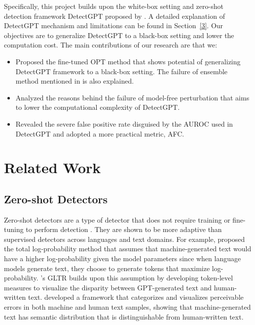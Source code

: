 \documentclass[11pt]{article}
\begin{document}
Specifically, this project builds upon the white-box setting and zero-shot detection framework DetectGPT proposed by \citet{detectgpt}. A detailed explanation of DetectGPT mechanism and limitations can be found in Section~\ref{3}. Our objectives are to generalize DetectGPT to a black-box setting and lower the computation cost. The main contributions of our research are that we:

\begin{itemize}[noitemsep, topsep=-8pt]
    \item Proposed the fine-tuned OPT method that shows potential of generalizing DetectGPT framework to a black-box setting. The failure of ensemble method mentioned in \citet{detectgpt} is also explained. 
    \item Analyzed the reasons behind the failure of model-free perturbation that aims to lower the computational complexity of DetectGPT.
    \item Revealed the severe false positive rate disguised by the AUROC used in DetectGPT and adopted a more practical metric, AFC.
\end{itemize}

\section{Related Work}
\subsection{Zero-shot Detectors}
Zero-shot detectors are a type of detector that does not require training or fine-tuning to perform detection \cite{jawahar20}. They are shown to be more adaptive than supervised detectors across languages and text domains. For example, \citet{Solaiman2019ReleaseSA} proposed the total log-probability method that assumes that machine-generated text would have a higher log-probability given the model parameters since when language models generate text, they choose to generate tokens that maximize log-probability. \citet{Gehrmann2019GLTRSD}'s GLTR builds upon this assumption by developing token-level measures to visualize the disparity between GPT-generated text and human-written text. \citet{Dou2021IsGT} developed a framework that categorizes and visualizes perceivable errors in both machine and human text samples, showing that machine-generated text has semantic distribution that is distinguishable from human-written text.
\end{document}
